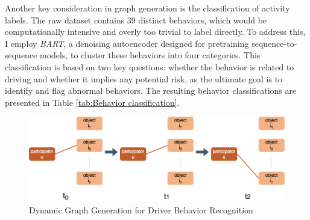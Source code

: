 Another key consideration in graph generation is the classification of activity labels. The raw dataset contains 39 distinct behaviors, which would be computationally intensive and overly too trivial to label directly. To address this, I employ \textit{BART}, a denoising autoencoder designed for pretraining sequence-to-sequence models, to cluster these behaviors into four categories. This classification is based on two key questions: whether the behavior is related to driving and whether it implies any potential risk, as the ultimate goal is to identify and flag abnormal behaviors. The resulting behavior classifications are presented in Table \ref{tab:Behavior classification}.

\begin{figure}[h]
    \centering
    \includegraphics[width=\linewidth]{figures/04_DynamicGraph.png}
    \caption{Dynamic Graph Generation for Driver Behavior Recognition}
    \label{fig:DynamicGraph}
\end{figure}



